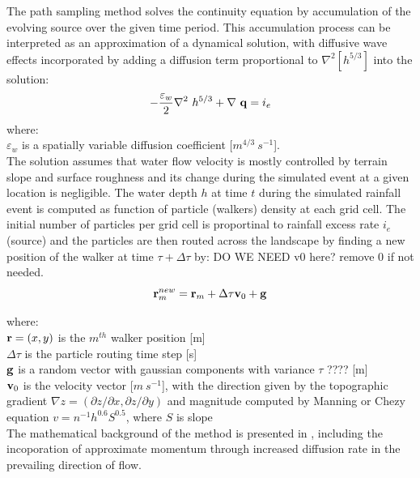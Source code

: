 \documentclass[gmd, manuscript]{copernicus}
\begin{document}
The path sampling method solves the continuity equation by accumulation of the evolving source
over the given time period. This accumulation process can be interpreted as
an approximation of a dynamical solution,
with diffusive wave effects incorporated by adding a diffusion term proportional to
$ \nabla^2 [h^{5/3}]$
into the solution:
\begin{equation}
\label{eq:difwater}
-{\varepsilon_w\over 2 }\nabla^2 ~ h^{5/3}
+\nabla ~ {\bf q} = i_e
\end{equation}
{\small
\noindent
 where: \\
 \noindent
 \hspace*{0.5em} $\varepsilon_w$ is a spatially variable diffusion coefficient [$\unit{m}^{4/3}~\unit{s}^{-1}$]. \\
}
The solution assumes that water flow velocity is mostly controlled by terrain slope and surface roughness 
and its change during the simulated event at a given location is negligible. 
The water depth $h$ at time $t$ during the simulated rainfall event
 is computed as function of particle (walkers) density at each grid cell. 
The initial number of particles per grid cell is proportinal to rainfall excess rate $i_e$ (source)
and the particles are then routed across the landscape by finding a new position of the walker at time $\tau + \Delta \tau$ by:
DO WE NEED v0 here? remove 0 if not needed.
\begin{equation}
{\bf r}_m^{new}={\bf r}_m + \Delta \tau {\bf v}_0 + {\bf g}
\end{equation}

{\small
\noindent
where: \\
\noindent
\hspace*{0.5em} ${\bf r} = (x, y)$ is the $m^{th}$ walker position [\unit{m}]\\
\hspace*{0.5em} $\Delta \tau$ is the particle routing time step [\unit{s}]\\
\hspace*{0.5em} ${\bf g}$ is a random vector with gaussian components with variance $\tau$ ????  [\unit{m}]\\
\hspace*{0.5em} ${\bf v}_0 $ is the velocity vector [$\unit{m~s^{-1}}$],  
 with the direction given by the topographic gradient $\nabla z = (\partial z / \partial x, \partial z / \partial y)$
and magnitude computed by Manning or Chezy equation $v=n^{-1}h^{0.6}S^{0.5}$, where $S$ is slope\\ 
}
The mathematical background of the method is presented in \citep{Mitas1998,Mitasova2005}, including the incoporation
of approximate momentum through increased diffusion rate in the prevailing direction of flow.
\end{document}
